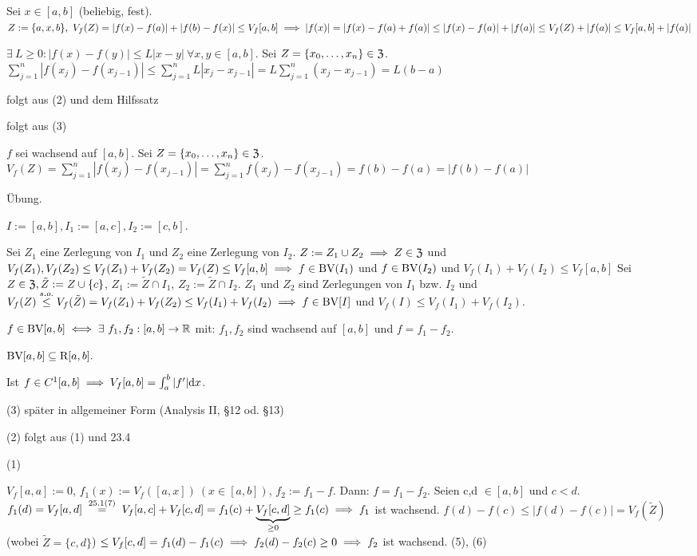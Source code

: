 \documentclass[a4paper,oneside,DIV15,BCOR12mm]{scrbook}
\begin{document}
\begin{beweise}
\item Sei $x\in [a,b]$ (beliebig, fest). $Z:=\{a,x,b\},\ V_f(Z)=|f(x)-f(a)|+|f(b)-f(x)|\le V_f[a,b]\folgt|f(x)|=|f(x)-f(a)+f(a)|\le |f(x)-f(a)|+|f(a)|\le V_f(Z)+|f(a)|\le V_f[a,b]+|f(a)|$
\item $\exists\ L \ge 0:|f(x)-f(y)|\le L|x-y|\ \forall x,y\in[a,b]$. Sei $Z=\{x_0,\ldots,x_n\}\in\mathfrak{Z}$. $\sum^n_{j=1}|f(x_j)-f(x_{j-1})|\le\sum^n_{j=1}L|x_j-x_{j-1}|=L\sum^n_{j=1}(x_j-x_{j-1})=L(b-a)$
\item folgt aus (2) und dem Hilfssatz
\item folgt aus (3)
\item $f$ sei wachsend auf $[a,b]$. Sei $Z=\{x_0,\ldots,x_n\}\in\mathfrak{Z}$. $V_f(Z)=\sum^n_{j=1}|f(x_j)-f(x_{j-1})|=\sum^n_{j=1}f(x_j)-f(x_{j-1})=f(b)-f(a)=|f(b)-f(a)|$
\item Übung.
\item $I:=[a,b],I_1:=[a,c],I_2:=[c,b]$.
\begin{description}
\hin Sei $Z_1$ eine Zerlegung von $I_1$ und $Z_2$ eine Zerlegung von $I_2$. $Z:=Z_1 \cup Z_2\implies Z\in\mathfrak{Z}$ und $V_f(Z_1),V_f(Z_2)\le V_f(Z_1)+V_f(Z_2)=V_f(Z)\le V_f[a,b]\implies f\in\text{BV}(I_1)$ und $f\in\text{BV}(I_2)$ und $V_f(I_1)+V_f(I_2)\le V_f[a,b]$
\zurueck Sei $Z \in\mathfrak{Z},\tilde{Z}:=Z\cup\{c\}$, $Z_1:=\tilde{Z}\cap I_1$, $Z_2:=\tilde{Z}\cap I_2$. $Z_1$ und $Z_2$ sind Zerlegungen von $I_1$ bzw. $I_2$ und $V_f(Z)\overset{s.o.}{\le}V_f(\tilde{Z})=V_f(Z_1)+V_f(Z_2)\le V_f(I_1)+V_f(I_2)\implies f\in\text{BV}[I]$ und $V_f(I)\le V_f(I_1)+V_f(I_2)$.
\end{description}
\end{beweise}

\begin{satz}
\begin{liste}
\item $f\in\BV[a,b]\equizu\exists\ f_1,f_2:[a,b]\to\MdR$ mit: $f_1,f_2$ sind wachsend auf $[a,b]$ und $f=f_1-f_2$.
\item $\text{BV}[a,b]\subseteq \text{R}[a,b].$
\item Ist $f\in C^1[a,b]\implies V_f[a,b]=\int_a^b|f'|\text{d}x$.
\end{liste}
\end{satz}

\begin{beweise}
\item[(3)] später in allgemeiner Form (Analysis II, §12 od. §13)
\item[(2)] folgt aus (1) und 23.4
\item[(1)]
\begin{description}
\hin $V_f[a,a]:=0$, $f_1(x):=V_f([a,x])\ (x\in[a,b])$, $f_2:=f_1-f$. Dann: $f=f_1-f_2$. Seien c,d $\in [a,b]$ und $c<d$. $f_1(d)=V_f[a,d]\gleichnach{25.1(7)}V_f[a,c]+V_f[c,d]=f_1(c)+\underbrace{V_f[c,d]}_{\ge 0}\ge f_1(c)\folgt f_1$ ist wachsend. $f(d)-f(c)\le|f(d)-f(c)|=V_f(\tilde{Z})$ (wobei $\tilde{Z}=\{c,d\}$) $\le V_f[c,d]=f_1(d)-f_1(c)\implies f_2(d)-f_2(c)\ge 0 \implies f_2$ ist wachsend.
(5), (6)
\end{description}
\end{beweise}
\end{document}

